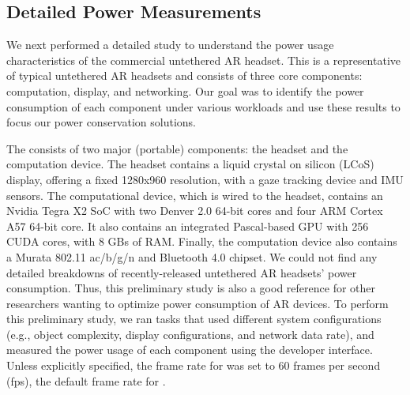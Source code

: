 
\subsection{Detailed Power Measurements}

We next performed a detailed study to understand the power usage characteristics of the {\mlo} commercial untethered AR headset. This is a representative of typical untethered AR headsets and consists of three core components: computation, 
display, and networking. Our goal was to identify the power consumption of each component under various workloads and use these results to focus our power conservation solutions. 

%
%
The {\mlo} consists of two major (portable) components: the headset and 
the computation device. The headset contains a liquid crystal on silicon (LCoS) 
display, offering a fixed 1280x960 resolution, with a gaze tracking device and IMU sensors. The computational device, which is wired to the headset, contains an Nvidia Tegra X2 SoC with two Denver 2.0 64-bit cores and four ARM Cortex A57 64-bit core. It also contains an integrated Pascal-based GPU with 256 CUDA cores, with 8 GBs of RAM.  Finally, the computation device also contains a Murata 802.11 ac/b/g/n and Bluetooth 4.0 chipset.
%
We could not find any detailed breakdowns of recently-released untethered AR headsets' power consumption. Thus, this preliminary study is also a good reference for other researchers wanting to optimize power consumption of AR devices. To perform this preliminary study, we ran tasks that used different system configurations 
(e.g., object complexity, display configurations, and network data rate), and measured the power usage of each component using the {\mlo} developer interface. Unless explicitly specified, the frame rate for was set to 60 frames per second (fps), the default frame rate for {\mlo}.


